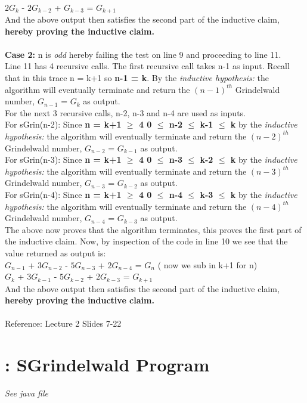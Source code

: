 \documentclass{article}
\begin{document}
    \\ $2G_{k}$  - $2G_{k-2}$ + $G_{k-3}$ = $G_{k+1}$
    \\ And the above output then satisfies the second part of the inductive claim, \textbf{hereby proving the inductive claim.}
    \\
    \\\textbf{Case 2:} n is \textit{odd} hereby failing the test on line 9 and proceeding to line 11.
    \\Line 11 has 4 recursive calls. The first recursive call takes n-1 as input. Recall that in this trace n = k+1 so \textbf{n-1 = k}. By the \textit{inductive hypothesis: }the algorithm will eventually terminate and return the $(n-1)^{th}$ Grindelwald number, $G_{n-1}$ = $G_{k}$ as output.
    \\For the next 3 recursive calls, n-2, n-3 and n-4 are used as inputs.
    \\For sGrin(n-2): Since \textbf{n = k+1 $\geq$ 4 0 $\leq$ n-2 $\leq$ k-1 $\leq$ k} by the \textit{inductive hypothesis: }the algorithm will eventually terminate and return the $(n-2)^{th}$ Grindelwald number, $G_{n-2}$ =  $G_{k-1}$ as output.
    \\For sGrin(n-3): Since \textbf{n = k+1 $\geq$ 4 0 $\leq$ n-3 $\leq$ k-2 $\leq$ k} by the \textit{inductive hypothesis: }the algorithm will eventually terminate and return the $(n-3)^{th}$ Grindelwald number, $G_{n-3}$ =  $G_{k-2}$ as output.
    \\For sGrin(n-4): Since \textbf{n = k+1 $\geq$ 4 0 $\leq$ n-4 $\leq$ k-3 $\leq$ k} by the \textit{inductive hypothesis: }the algorithm will eventually terminate and return the $(n-4)^{th}$ Grindelwald number, $G_{n-4}$ =  $G_{k-3}$ as output.
    \\The above now proves that the algorithm terminates, this proves the first part of the inductive claim. Now, by inspection of the code in line 10 we see that the value returned as output is:\\
    $G_{n-1}$  + $3G_{n-2}$ - $5G_{n-3}$ + $2G_{n-4}$ = $G_{n}$ ( now we sub in k+1 for n)
    \\$G_{k}$  + $3G_{k-1}$ - $5G_{k-2}$ + $2G_{k-3}$ = $G_{k+1}$
    \\ And the above output then satisfies the second part of the inductive claim, \textbf{hereby proving the inductive claim.}
    \\
    \\Reference: Lecture 2 Slides 7-22


    \section{: SGrindelwald Program} \textit{See java file}
\end{document}
